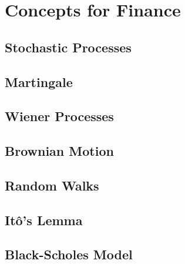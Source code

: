 \chapter{Concepts for Finance}
\label{finance}

\section{Stochastic Processes}
\label{finance:sp}

\section{Martingale}
\label{finance:martingale}

\section{Wiener Processes}
\label{finance:wiener}

\section{Brownian Motion}
\label{finance:brownian}

\section{Random Walks}
\label{finance:rand_walk}

\section{It\^o's Lemma}
\label{finance:ito_lemma}

\section{Black-Scholes Model}
\label{finance:black_scholes}

